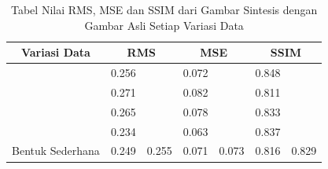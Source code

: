 \documentclass[conference]{IEEEtran}
\begin{document}
\begin{table}[]
  \caption{Tabel Nilai RMS, MSE dan SSIM dari Gambar Sintesis dengan Gambar Asli Setiap Variasi Data}
  \label{tb:evaluasimatriks}
  \begin{tabular}{|l|cc|cc|cc|}
  \hline
  \multicolumn{1}{|c|}{Variasi Data}                  & \multicolumn{2}{c|}{RMS}                                                                               & \multicolumn{2}{c|}{MSE}                                                                                   & \multicolumn{2}{c|}{SSIM}                                                                            \\ \hline
                                                      & \multicolumn{1}{c|}{\cellcolor[HTML]{FFFFFF}0.256} & \cellcolor[HTML]{FFFFFF}                         & \multicolumn{1}{c|}{\cellcolor[HTML]{FFFFFF}0.072}  & \cellcolor[HTML]{FFFFFF}                           & \multicolumn{1}{c|}{\cellcolor[HTML]{FFFFFF}0.848} & \cellcolor[HTML]{FFFFFF}                        \\ \cline{2-2} \cline{4-4} \cline{6-6}
                                                      & \multicolumn{1}{c|}{\cellcolor[HTML]{FFFFFF}0.271} & \cellcolor[HTML]{FFFFFF}                         & \multicolumn{1}{c|}{\cellcolor[HTML]{FFFFFF}0.082}  & \cellcolor[HTML]{FFFFFF}                           & \multicolumn{1}{c|}{\cellcolor[HTML]{FFFFFF}0.811} & \cellcolor[HTML]{FFFFFF}                        \\ \cline{2-2} \cline{4-4} \cline{6-6}
                                                      & \multicolumn{1}{c|}{\cellcolor[HTML]{FFFFFF}0.265} & \cellcolor[HTML]{FFFFFF}                         & \multicolumn{1}{c|}{\cellcolor[HTML]{FFFFFF}0.078}  & \cellcolor[HTML]{FFFFFF}                           & \multicolumn{1}{c|}{\cellcolor[HTML]{FFFFFF}0.833} & \cellcolor[HTML]{FFFFFF}                        \\ \cline{2-2} \cline{4-4} \cline{6-6}
                                                      & \multicolumn{1}{c|}{\cellcolor[HTML]{FFFFFF}0.234} & \cellcolor[HTML]{FFFFFF}                         & \multicolumn{1}{c|}{\cellcolor[HTML]{FFFFFF}0.063}  & \cellcolor[HTML]{FFFFFF}                           & \multicolumn{1}{c|}{\cellcolor[HTML]{FFFFFF}0.837} & \cellcolor[HTML]{FFFFFF}                        \\ \cline{2-2} \cline{4-4} \cline{6-6}
  \multirow{-5}{*}{Bentuk Sederhana}          & \multicolumn{1}{c|}{\cellcolor[HTML]{FFFFFF}0.249} & \multirow{-5}{*}{\cellcolor[HTML]{FFFFFF}0.255}  & \multicolumn{1}{c|}{\cellcolor[HTML]{FFFFFF}0.071}  & \multirow{-5}{*}{\cellcolor[HTML]{FFFFFF}0.073}       & \multicolumn{1}{c|}{\cellcolor[HTML]{FFFFFF}0.816} & \multirow{-5}{*}{\cellcolor[HTML]{FFFFFF}0.829} \\ \hline

\end{tabular}
\end{table}
\end{document}
